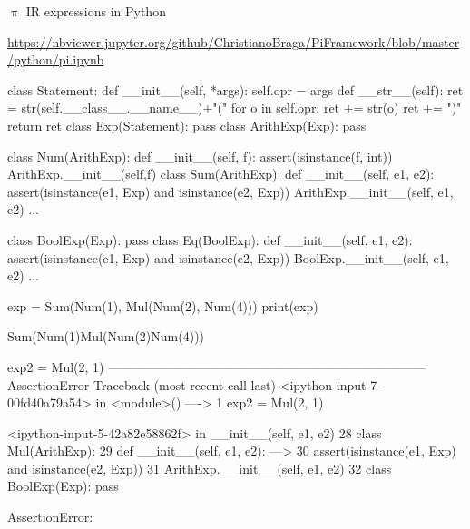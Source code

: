 \documentclass{beamer}
\begin{document}
\begin{frame}{{\color{red}$\uppi$ IR} expressions in Python}

{\footnotesize\url{https://nbviewer.jupyter.org/github/ChristianoBraga/PiFramework/blob/master/python/pi.ipynb}}

\begin{python}
class Statement: 
    def __init__(self, *args):
        self.opr = args
    def __str__(self):
        ret = str(self.__class__.__name__)+"("
        for o in self.opr:
            ret += str(o)
        ret += ")"
        return ret
class Exp(Statement): pass
class ArithExp(Exp): pass
\end{python}

\framebreak

\begin{python}
class Num(ArithExp): 
    def __init__(self, f): 
        assert(isinstance(f, int))
        ArithExp.__init__(self,f)
class Sum(ArithExp): 
    def __init__(self, e1, e2): 
        assert(isinstance(e1, Exp) and isinstance(e2, Exp))
        ArithExp.__init__(self, e1, e2)
$\ldots$
\end{python}

\framebreak

\begin{python}
class BoolExp(Exp): pass
class Eq(BoolExp):
    def __init__(self, e1, e2):
        assert(isinstance(e1, Exp) and isinstance(e2, Exp))
        BoolExp.__init__(self, e1, e2)
$\ldots$
\end{python}

\framebreak

\begin{python}
exp = Sum(Num(1), Mul(Num(2), Num(4)))
print(exp)

Sum(Num(1)Mul(Num(2)Num(4)))
\end{python}

\framebreak

\begin{python}
exp2 = Mul(2, 1)
---------------------------------------------------------------------------
AssertionError                            Traceback (most recent call last)
<ipython-input-7-00fd40a79a54> in <module>()
----> 1 exp2 = Mul(2, 1)

<ipython-input-5-42a82e58862f> in __init__(self, e1, e2)
     28 class Mul(ArithExp):
     29     def __init__(self, e1, e2):
---> 30         assert(isinstance(e1, Exp) and isinstance(e2, Exp))
     31         ArithExp.__init__(self, e1, e2)
     32 class BoolExp(Exp): pass

AssertionError: 
\end{python}
\end{frame}
\end{document}
